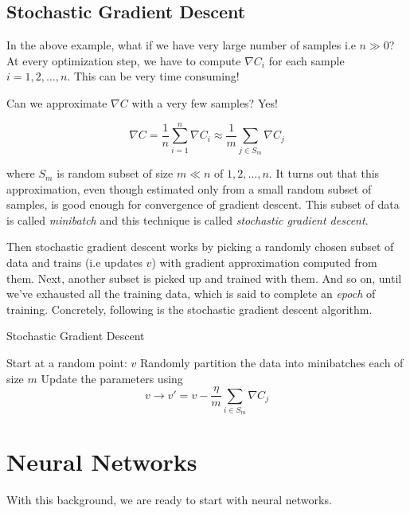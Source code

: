 \documentclass[a4paper]{tufte-handout}
\begin{document}
\subsection{Stochastic Gradient Descent}\label{stochastic-gradient-descent}

In the above example, what if we have very large number of samples i.e
\(n \gg 0\)? At every optimization step, we have to compute
\(\nabla C_i\) for each sample \(i = 1, 2, \ldots, n\). This can be very
time consuming!

Can we approximate \(\nabla C\) with a very few samples? Yes!

\[ \nabla C = \frac{1}{n} \sum_{i = 1}^{n} \nabla C_i \approx \frac{1}{m} \sum_{j \in S_m} \nabla C_j \]

where \(S_m\) is random subset of size \(m \ll n\) of
\({1, 2, \ldots,n}\). It turns out that this approximation, even though
estimated only from a small random subset of samples, is good enough for
convergence of gradient descent. This subset of data is called
\emph{minibatch} and this technique is called \emph{stochastic gradient
descent}.

Then stochastic gradient descent works by picking a randomly chosen
subset of data and trains (i.e updates \(v\)) with gradient
approximation computed from them. Next, another subset is picked up and
trained with them. And so on, until we've exhausted all the training
data, which is said to complete an \emph{epoch} of training. Concretely,
following is the stochastic gradient descent algorithm.

\begin{algorithm}
\caption{Stochastic Gradient Descent}
\begin{algorithmic}[1]
  \STATE Start at a random point: \(v\)
      \STATE Randomly partition the data into minibatches each of size $m$ 
        \STATE Update the parameters using \[v \rightarrow v' = v -\frac{\eta}{m} \sum_{i \in S_m} \nabla C_j\]
      \ENDFOR
  \ENDFOR
\end{algorithmic}
\end{algorithm}

\section{Neural Networks}\label{neural-networks}

With this background, we are ready to start with neural networks.
\end{document}
